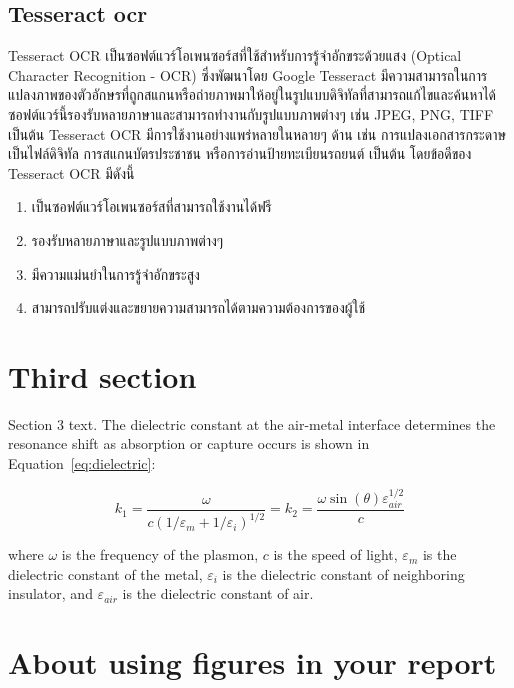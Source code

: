   \subsection{Tesseract ocr}
    \qquad Tesseract OCR เป็นซอฟต์แวร์โอเพนซอร์สที่ใช้สำหรับการรู้จำอักขระด้วยแสง 
    (Optical Character Recognition - OCR) ซึ่งพัฒนาโดย Google Tesseract
    มีความสามารถในการแปลงภาพของตัวอักษรที่ถูกสแกนหรือถ่ายภาพมาให้อยู่ในรูปแบบดิจิทัลที่สามารถแก้ไขและค้นหาได้
    ซอฟต์แวร์นี้รองรับหลายภาษาและสามารถทำงานกับรูปแบบภาพต่างๆ เช่น JPEG, PNG, TIFF เป็นต้น Tesseract OCR
    มีการใช้งานอย่างแพร่หลายในหลายๆ ด้าน เช่น การแปลงเอกสารกระดาษเป็นไฟล์ดิจิทัล การสแกนบัตรประชาชน
    หรือการอ่านป้ายทะเบียนรถยนต์ เป็นต้น โดยข้อดีของ Tesseract OCR มีดังนี้
    \begin{enumerate}
      \item เป็นซอฟต์แวร์โอเพนซอร์สที่สามารถใช้งานได้ฟรี
      \item รองรับหลายภาษาและรูปแบบภาพต่างๆ
      \item มีความแม่นยำในการรู้จำอักขระสูง
      \item สามารถปรับแต่งและขยายความสามารถได้ตามความต้องการของผู้ใช้
    \end{enumerate}

\section{Third section}
Section 3 text. The dielectric constant
at the air-metal interface determines
the resonance shift as absorption or capture occurs
is shown in Equation~\eqref{eq:dielectric}:

\begin{equation}\label{eq:dielectric}
k_1=\frac{\omega}{c({1/\varepsilon_m + 1/\varepsilon_i})^{1/2}}=k_2=\frac{\omega
\sin(\theta)\varepsilon_\mathit{air}^{1/2}}{c}
\end{equation}

\noindent
where $\omega$ is the frequency of the plasmon, $c$ is the speed of
light, $\varepsilon_m$ is the dielectric constant of the metal,
$\varepsilon_i$ is the dielectric constant of neighboring insulator,
and $\varepsilon_\mathit{air}$ is the dielectric constant of air.

\section{About using figures in your report}

\newcommand{\loremipsum}{
  \textit{Lorem ipsum dolor sit amet, consectetur adipisicing elit, sed do
  eiusmod tempor incididunt ut labore et dolore magna aliqua. Ut enim ad
  minim veniam, quis nostrud exercitation ullamco laboris nisi ut
  aliquip ex ea commodo consequat. Duis aute irure dolor in
  reprehenderit in voluptate velit esse cillum dolore eu fugiat nulla
  pariatur. Excepteur sint occaecat cupidatat non proident, sunt in
  culpa qui officia deserunt mollit anim id est laborum.}\par}

